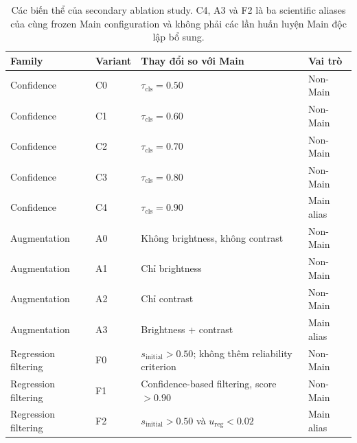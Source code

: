 \documentclass[pdflatex,sn-mathphys-num]{sn-jnl}%
\theoremstyle{thmstyleone}%
\theoremstyle{thmstyletwo}%
\theoremstyle{thmstylethree}%
\begin{document}
\begin{table}[htbp]
    \centering
    \caption{Các biến thể của secondary ablation study. C4, A3 và F2 là
    ba scientific aliases của cùng frozen Main configuration và không phải
    các lần huấn luyện Main độc lập bổ sung.}
    \label{tab:ssl_ablation_variants}
    \small
    \setlength{\tabcolsep}{5pt}
    \renewcommand{\arraystretch}{1.08}
    \begin{tabular}{llll}
        \toprule
        \textbf{Family} &
        \textbf{Variant} &
        \textbf{Thay đổi so với Main} &
        \textbf{Vai trò} \\
        \midrule

        Confidence &
        C0 &
        \(\tau_{\mathrm{cls}}=0.50\) &
        Non-Main \\

        Confidence &
        C1 &
        \(\tau_{\mathrm{cls}}=0.60\) &
        Non-Main \\

        Confidence &
        C2 &
        \(\tau_{\mathrm{cls}}=0.70\) &
        Non-Main \\

        Confidence &
        C3 &
        \(\tau_{\mathrm{cls}}=0.80\) &
        Non-Main \\

        Confidence &
        C4 &
        \(\tau_{\mathrm{cls}}=0.90\) &
        Main alias \\

        Augmentation &
        A0 &
        Không brightness, không contrast &
        Non-Main \\

        Augmentation &
        A1 &
        Chỉ brightness &
        Non-Main \\

        Augmentation &
        A2 &
        Chỉ contrast &
        Non-Main \\

        Augmentation &
        A3 &
        Brightness + contrast &
        Main alias \\

        Regression filtering &
        F0 &
        \(s_{\mathrm{initial}}>0.50\);
        không thêm reliability criterion &
        Non-Main \\

        Regression filtering &
        F1 &
        Confidence-based filtering,
        score \(>0.90\) &
        Non-Main \\

        Regression filtering &
        F2 &
        \(s_{\mathrm{initial}}>0.50\) và
        \(u_{\mathrm{reg}}<0.02\) &
        Main alias \\
        \bottomrule
    \end{tabular}
\end{table}
\end{document}
